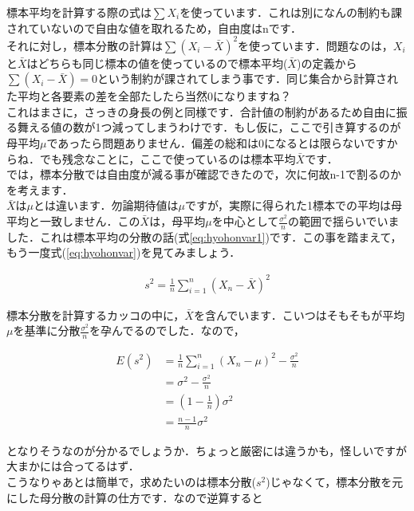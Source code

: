 \documentclass[11pt,a4paper,uplatex]{ujreport} 	%
\begin{document}
標本平均を計算する際の式は$\sum X_i$を使っています．これは別になんの制約も課されていないので自由な値を取れるため，自由度はnです．\\

それに対し，標本分散の計算は$\sum (X_i -\bar{X})^2$を使っています．問題なのは，$X_i$と$\bar{X}$はどちらも同じ標本の値を使っているので標本平均($\bar{X}$)の定義から$\sum (X_i - \bar{X}) = 0$という制約が課されてしまう事です．同じ集合から計算された平均と各要素の差を全部たしたら当然0になりますね？\\

これはまさに，さっきの身長の例と同様です．合計値の制約があるため自由に振る舞える値の数が1つ減ってしまうわけです．もし仮に，ここで引き算するのが母平均$\mu$であったら問題ありません．偏差の総和は0になるとは限らないですからね．でも残念なことに，ここで使っているのは標本平均$\bar{X}$です．\\

では，標本分散では自由度が減る事が確認できたので，次に何故n-1で割るのかを考えます．\\

$\bar{X}$は$\mu$とは違います．勿論期待値は$\mu$ですが，実際に得られた1標本での平均は母平均と一致しません．この$\bar{X}$は，母平均$\mu$を中心として$\frac{\sigma^2}{n}$の範囲で揺らいでいました．これは標本平均の分散の話(式\ref{eq:hyohonvar1})です．この事を踏まえて，もう一度式(\ref{eq:hyohonvar})を見てみましょう．

\begin{align}
  s^2 = \frac{1}{n} \sum_{i=1}^n(X_n - \bar{X})^2
\end{align}

標本分散を計算するカッコの中に，$\bar{X}$を含んでいます．こいつはそもそもが平均$\mu$を基準に分散$\frac{\sigma^2}{n}$を孕んでるのでした．なので，

\begin{align}
  E(s^2) &= \frac{1}{n} \sum_{i=1}^n(X_n - \mu)^2 - \frac{\sigma^2}{n}\\
      &= \sigma^2 - \frac{\sigma^2}{n}\\
      &= (1-\frac{1}{n})\sigma^2\\
      &= \frac{n-1}{n}\sigma^2
\end{align}

となりそうなのが分かるでしょうか．ちょっと厳密には違うかも，怪しいですが大まかには合ってるはず．\\

こうなりゃあとは簡単で，求めたいのは標本分散($s^2$)じゃなくて，標本分散を元にした母分散の計算の仕方です．なので逆算すると
\end{document}

